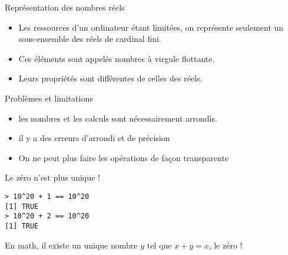 \documentclass[10pt]{beamer}
\begin{document}
\begin{frame}[fragile]{Représentation des nombres réels}                                                                                                                
  \begin{itemize}
  \item Les ressources d'un ordinateur étant limitées, on représente seulement un \alert{sous-ensemble des réels de cardinal fini}.
  \item Ces éléments sont appelés \alert{nombres à virgule flottante}.
  \item<alert@1> Leurs propriétés sont différentes de celles des réels.
  \end{itemize}

  \begin{alertblock}{Problèmes et limitations}
    \begin{itemize}
    \item les nombres et les calculs sont nécessairement arrondis.
    \item il y a des erreurs d’arrondi et de précision
    \item On ne peut plus faire les opérations de façon transparente
  \end{itemize}
\end{alertblock}


\begin{exampleblock}{Le zéro n'est plus unique !}
\begin{lstlisting}[style=block]
> 10^20 + 1 == 10^20 
[1] TRUE
> 10^20 + 2 == 10^20 
[1] TRUE
\end{lstlisting}
En math, il existe un unique nombre $y$ tel que $x + y = x$, le zéro !
\end{exampleblock}
\end{frame}

\end{document}
